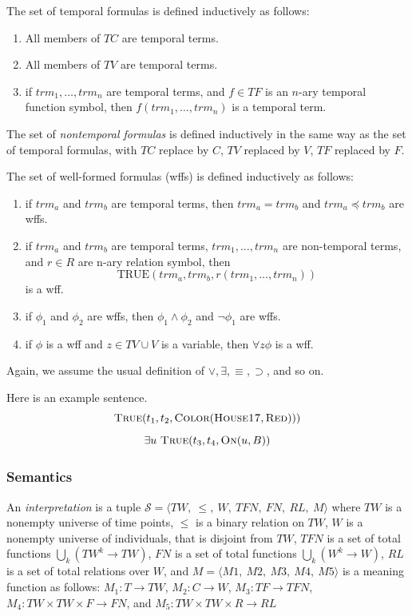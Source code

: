 The set of temporal formulas is defined inductively as follows:
\begin{enumerate}
	\item All members of $TC$ are temporal terms.
	\item All members of $TV$ are temporal terms.
	\item if $trm_1, \dots, trm_n$ are temporal terms, and $f \in TF$ is an $n$-ary temporal function symbol, then $f(trm_1, \dots, trm_n)$ is a temporal term.
\end{enumerate}

The set of \textit{nontemporal formulas} is defined inductively in the same way as the set of temporal formulas, with
$TC$ replace by $C$, $TV$ replaced by $V$, $TF$ replaced by $F$.

The set of well-formed formulas (wffs) is defined inductively as follows:
\begin{enumerate}
	\item if $trm_a$ and $trm_b$ are temporal terms, then $trm_a = trm_b$ and $trm_a \preceq trm_b$ are wffs.
	\item if $trm_a$ and $trm_b$ are temporal terms, $trm_1, \dots, trm_n$ are non-temporal terms, and $r \in R$ are n-ary relation symbol,
	      then
	      \[
		      \text{TRUE}(trm_a, trm_b, r(trm_1, \dots, trm_n))
	      \]
	      is a wff.
	\item if $\phi_1$ and $\phi_2$ are wffs, then $\phi_1 \land \phi_2$ and $\neg \phi_1$ are wffs.
	\item if $\phi$ is a wff and $z \in TV \cup V$ is a variable, then $\forall z \phi$ is a wff.
\end{enumerate}

Again, we assume the usual definition of $\lor, \exists, \equiv, \supset$, and so on.

\begin{exmp} Here is an example sentence.
	\begin{equation}
		\textsc{True}(t_1, t_2, \textsc{Color}(\textsc{House17}, \textsc{Red})))
	\end{equation}
	\begin{equation}
		\exists u \ \textsc{True}(t_3, t_4, \textsc{On}(u,B))
	\end{equation}
\end{exmp}

\subsubsection{Semantics}
An \textit{interpretation} is a tuple $\mathscr{S} = \langle  TW,\ \leqslant,\ W,\ TFN,\ FN,\ RL,\ M\rangle$ where $TW$
is a nonempty universe of time points, $\leqslant$ is a binary relation on $TW$, $W$ is a nonempty universe of individuals,
that is disjoint from $TW$, $TFN$ is a set of total functions $\bigcup_k (TW^k \rightarrow TW)$,
$FN$ is a set of total functions $ \bigcup_k (W^k \rightarrow W)$, $RL$ is a set of total relations over $W$, and
$M = \langle M1,\ M2,\ M3,\ M4,\ M5 \rangle$ is a meaning function as follows: $M_1 : T \rightarrow TW$,
$M_2: C \to W$, $M_3 : TF \to TFN$, $M_4 : TW \times TW \times F \to FN$, and $M_5: TW \times TW \times R \to RL$

